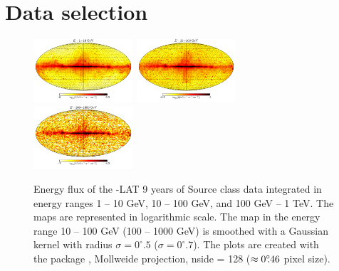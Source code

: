 \section{Data selection}


\begin{figure}[h]
\includegraphics[width=0.33\textwidth]{plots/Mollweide_data_source_range_0.pdf}
\includegraphics[width=0.33\textwidth]{plots/Mollweide_data_source_range_1.pdf}
\includegraphics[width=0.33\textwidth]{plots/Mollweide_data_source_range_2.pdf}
\caption{
Energy flux of the \Fermi-LAT 9 years of Source class data integrated in energy ranges 1 -- 10 GeV, 10 -- 100 GeV, and 100 GeV -- 1 TeV.
The maps are represented in logarithmic scale. 
The map in the energy range 10 -- 100 GeV (100 -- 1000 GeV) 
is smoothed with a Gaussian kernel with radius $\sigma = 0^\circ\!\!.5$ ($\sigma = 0^\circ\!\!.7$).
The plots are created with the \Healpix package \citep{2005ApJ...622..759G}, Mollweide projection, 
nside = 128 ($\approx 0^\circ\!\!.46$ pixel size). 
}
\label{fig:Maps_data}
\end{figure}

